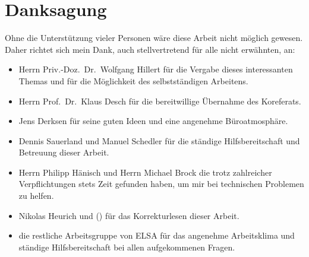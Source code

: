 \chapter*{Danksagung}
\label{sec:danksagung}
Ohne die Unterstützung vieler Personen wäre diese Arbeit nicht möglich gewesen.
Daher richtet sich mein Dank, auch stellvertretend für alle nicht erwähnten, an:
\begin{itemize}
	\item Herrn Priv.-Doz.\ Dr.\ Wolfgang Hillert für die Vergabe dieses interessanten Themas und für die Möglichkeit des selbstständigen Arbeitens.
	
	\item Herrn Prof.\ Dr.\ Klaus Desch für die bereitwillige Übernahme des Koreferats.
	
	\item Jens Derksen für seine guten Ideen und eine angenehme Büroatmosphäre.
	
	\item Dennis Sauerland und Manuel Schedler für die ständige Hilfsbereitschaft und Betreuung dieser Arbeit.
	
	\item Herrn Philipp Hänisch und Herrn Michael Brock die trotz zahlreicher Verpflichtungen stets Zeit gefunden haben, um mir bei technischen Problemen zu helfen.
	
	\item Nikolas Heurich und () für das Korrekturlesen dieser Arbeit.
	
	\item die restliche Arbeitsgruppe von ELSA für das angenehme Arbeitsklima und ständige Hilfsbereitschaft bei allen aufgekommenen Fragen.
\end{itemize}
